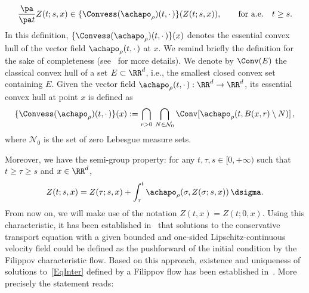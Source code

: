 \[
\frac{\pa}{\pa t} Z(t;s,x) \in \{ \Convess(\achapo_{\rho})(t,{\cdot\,})\}(Z(t;s,x)),
\qquad \text{for a.e.} \quad t \geq s.
\]
In this definition, $\{\Convess(\achapo_{\rho})(t,{\cdot\,}) \}(x)$ denotes the essential convex hull of the vector field $\achapo_{\rho}(t,{\cdot\,})$ at $x$. We remind briefly the definition for the sake of completeness (see~\cite{AubinCellina,Filippov} for more details). We denote by $\Conv(E)$ the classical convex hull of a set $E \subset \RR^d$, i.e., the smallest closed convex set containing $E$. Given the vector field $\achapo_{\rho}(t,{\cdot\,}):\RR^d\rightarrow\RR^d$, its essential convex hull at point $x$ is defined as
\[
\{ \Convess (\achapo_{\rho} )(t,{\cdot\,}) \}(x) :=\bigcap_{r>0}\, \bigcap_{N\in \mathcal{N}_0}
\Conv[\achapo_{\rho}(t, B(x,r)\setminus N)]\,,
\]
where $\mathcal{N}_0$ is the set of zero Lebesgue measure sets.

Moreover, we have the semi-group property: for any $t,\tau,s \in [0,+\infty)$ such that $t \geq \tau \geq s$ and $x\in \RR^d$,
\begin{equation}\label{eq:characteristics}
Z(t;s,x)=Z(\tau;s,x)+\int_{\tau}^t \achapo_{\rho}(\sigma,Z(\sigma;s,x))\,\dsigma.
\end{equation}
From now on, we will make use of the notation $Z(t,x)=Z(t;0,x)$. Using this characteristic, it has been established in~\cite{PoupaudRascle} that solutions to the conservative transport equation with a given bounded and one-sided Lipschitz-continuous velocity field could be defined as the pushforward of the initial condition by the Filippov characteristic flow. Based on this approach, existence and uniqueness of solutions to~\eqref{EqInter} defined by a Filippov flow has been established in~\cite{CJLV}. More precisely the statement reads:

